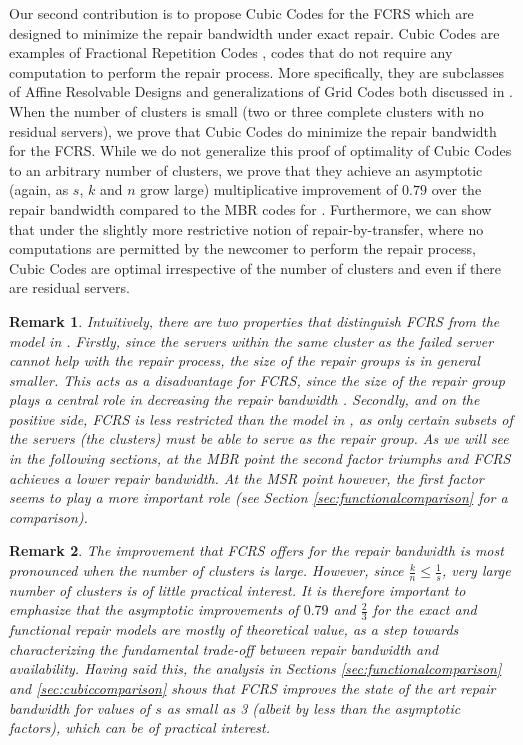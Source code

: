 \documentclass[journal,onecolumn,draftcls]{IEEEtran}
\newtheorem{rem}{Remark}
\begin{document}
Our second contribution is to propose Cubic Codes for the FCRS which are designed to minimize the repair bandwidth under exact repair. Cubic Codes are examples of Fractional Repetition Codes \cite{el2010fractional}, codes that do not require any computation to perform the repair process. More specifically, they are subclasses of Affine Resolvable Designs and generalizations of Grid Codes both discussed in \cite{olmez2016fractional}. When the number of clusters is small (two or three complete clusters with no residual servers), we prove that Cubic Codes do minimize the repair bandwidth for the FCRS. While we do not generalize this  proof of optimality of Cubic Codes to an arbitrary number of clusters, we prove that they achieve an asymptotic (again, as $s$, $k$ and $n$ grow large) multiplicative improvement of  $0.79$ over the repair bandwidth compared to the MBR codes for \cite{dimakis2010network}. Furthermore, we can show that under the slightly more restrictive notion of repair-by-transfer\cite{shah2012distributed}, where no computations are permitted by the newcomer to perform the repair process, Cubic Codes are optimal irrespective of the number of clusters and even if there are residual servers. 

\begin{rem}
Intuitively, there are two properties that distinguish FCRS from the model in \cite{dimakis2010network}. Firstly, since the servers within the same cluster as the failed server cannot help with the repair process, the size of the repair groups is in general smaller. This acts as a disadvantage for FCRS, since the size of the repair group plays a central role in decreasing the repair bandwidth \cite{dimakis2010network}. Secondly, and on the positive side, FCRS is less restricted than the model in \cite{dimakis2010network}, as only certain subsets of the servers (the clusters) must be able to serve as the repair group. As we will see in the following sections, at the MBR point the second factor triumphs and FCRS achieves a lower repair bandwidth. At the MSR point however, the first factor seems to play a more important role (see Section \ref{sec:functionalcomparison} for a comparison).
\end{rem}
\begin{rem}
The improvement that FCRS offers for the repair bandwidth is most pronounced when the number of clusters is large. However, since $\frac{k}{n}\le \frac{1}{s}$, very large number of clusters is of little practical interest. It is therefore important to emphasize that the asymptotic improvements of $0.79$ and $\frac{2}{3}$  for the exact and functional repair models are mostly of theoretical value, as a step towards characterizing the fundamental trade-off between repair bandwidth and availability. Having said this, the analysis in Sections \ref{sec:functionalcomparison} and \ref{sec:cubiccomparison} shows that FCRS improves the state of the art repair bandwidth for values of $s$ as small as 3 (albeit by less than the asymptotic factors), which can be of practical interest.
\end{rem}
\end{document}
